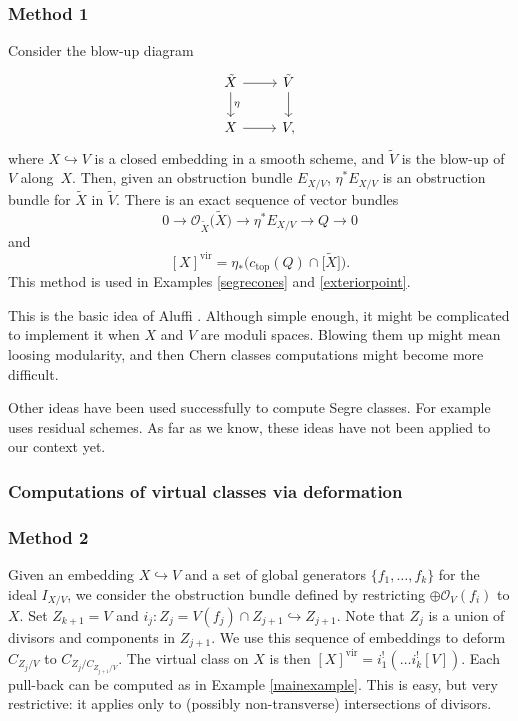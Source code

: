 \documentclass[pdftex]{sigma}
\numberwithin{equation}{section}
\newcommand{\vv}{\mathrm{vir}}
\newcommand{\OO}{\mathcal{O}}
\theoremstyle{plain}
\theoremstyle{definition}
\theoremstyle{remark}
\begin{document}
\subsubsection{Method 1} Consider the blow-up diagram
\[
\begin{tikzcd}
\tilde{X}\ar[r]\ar[d,"\eta"] & \tilde{V}\ar[d] \\
X\ar[r] & V,
\end{tikzcd}
\]
where $X\hookrightarrow V$ is a closed embedding in a smooth scheme, and $\tilde{V}$ is the blow-up of $V$ along~$X$. Then, given an obstruction bundle $E_{X/V}$, $\eta^*E_{X/V}$ is an obstruction bundle for $\tilde{X}$ in $\tilde{V}$. There is an exact sequence of vector bundles
\[ 0\to \mathcal O_{\tilde{X}}\big(\tilde{X}\big)\to \eta^*E_{X/V}\to Q\to 0
\]
and
\[
[X]^{\vv}=\eta_* \big(c_{\text{top}}(Q)\cap \big[\tilde{X}\big]\big).
\]
This method is used in Examples \ref{segrecones} and \ref{exteriorpoint}.
\begin{Remark} This is the basic idea of Aluffi \cite{A1}. Although simple enough, it might be complicated to implement it when $X$ and $V$ are moduli spaces. Blowing them up might mean loosing modularity, and then Chern classes computations might become more difficult.
\end{Remark}
\begin{Remark}Other ideas have been used successfully to compute Segre classes. For example~\cite{EJP} uses residual schemes. As far as we know, these ideas have not been applied to our context yet.
\end{Remark}

\subsubsection{Computations of virtual classes via deformation}

\subsubsection{Method 2} Given an embedding $X\hookrightarrow V$ and a set of global generators $\{f_1,\dots,f_k\}$ for the ideal $I_{X/V}$, we consider the obstruction bundle defined by restricting $\oplus \OO_V(f_i)$ to $X$. Set $Z_{k+1}=V$ and $i_j\colon Z_j=V(f_j)\cap Z_{j+1} \hookrightarrow Z_{j+1}$. Note that $Z_j$ is a union of divisors and components in $Z_{j+1}$. We use this sequence of embeddings to deform $C_{Z_j/V}$ to $C_{Z_j/C_{Z_{j+1}/V}}$. The virtual class on $X$ is then $[X]^{\vv}=i_1^!(\dots i_k^![V])$.
Each pull-back can be computed as in Example \ref{mainexample}. This is easy, but very restrictive: it applies only to (possibly non-transverse) intersections of divisors.
\end{document}
